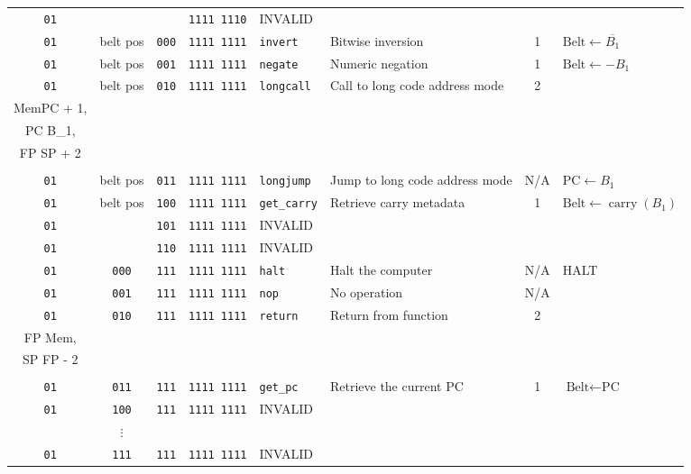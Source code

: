 \documentclass{article}
\begin{document}
\begin{landscape}
\begin{longtable}{c c c c l l c l}
		\texttt{01} & & & \texttt{1111 1110} & INVALID & & \\
		\texttt{01} & belt pos & \texttt{000} & \texttt{1111 1111} & \texttt{invert}     & Bitwise inversion              & 1   &
			\(\textrm{Belt} \gets \overline{B_1}\) \\
		\texttt{01} & belt pos & \texttt{001} & \texttt{1111 1111} & \texttt{negate}     & Numeric negation               & 1   &
			\(\textrm{Belt} \gets -B_1\) \\
		\texttt{01} & belt pos & \texttt{010} & \texttt{1111 1111} & \texttt{longcall}   & Call to long code address mode & 2 &
			\(\begin{array}{l}
				\textrm{Mem}\left[\textrm{SP}\right] \gets \textrm{FP}, \\
				\textrm{Mem}\left[\textrm{SP} + 1\right] \gets \textrm{PC} + 1, \\
				\textrm{PC} \gets B_1, \\
				\textrm{FP} \gets \textrm{SP} + 2 \\
			\end{array}\) \\
		\texttt{01} & belt pos & \texttt{011} & \texttt{1111 1111} & \texttt{longjump}   & Jump to long code address mode & N/A &
			\(\textrm{PC} \gets B_1\) \\
		\texttt{01} & belt pos & \texttt{100} & \texttt{1111 1111} & \texttt{get\_carry} & Retrieve carry metadata        & 1   &
			\(\textrm{Belt} \gets \operatorname{carry}\left(B_1\right)\) \\
		\texttt{01} & & \texttt{101} & \texttt{1111 1111} & INVALID & \\
		\texttt{01} & & \texttt{110} & \texttt{1111 1111} & INVALID & \\
		\texttt{01} & \texttt{000} & \texttt{111} & \texttt{1111 1111} & \texttt{halt}    & Halt the computer       & N/A & HALT \\
		\texttt{01} & \texttt{001} & \texttt{111} & \texttt{1111 1111} & \texttt{nop}     & No operation            & N/A & \\
		\texttt{01} & \texttt{010} & \texttt{111} & \texttt{1111 1111} & \texttt{return}  & Return from function    & 2 &
			\(\begin{array}{l}
				\textrm{PC} \gets \textrm{Mem}\left[\textrm{FP} - 1\right], \\
				\textrm{FP} \gets \textrm{Mem}\left[\textrm{FP} - 2\right], \\
				\textrm{SP} \gets \textrm{FP} - 2 \\
			\end{array}\) \\
		\texttt{01} & \texttt{011} & \texttt{111} & \texttt{1111 1111} & \texttt{get\_pc} & Retrieve the current PC & 1   &
			\(\textrm{Belt} \gets \textrm{PC}\) \\
		\texttt{01} & \texttt{100} & \texttt{111} & \texttt{1111 1111} & INVALID & \\
		            & \(\vdots\)   &              &                    &         & \\
		\texttt{01} & \texttt{111} & \texttt{111} & \texttt{1111 1111} & INVALID & \\


\end{longtable}
\end{landscape}
\end{document}

